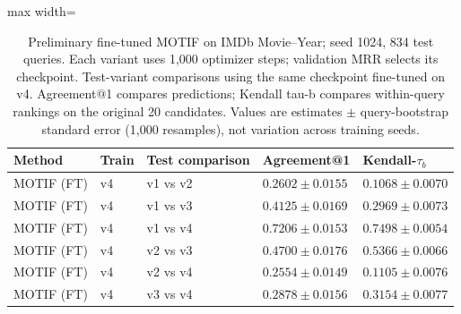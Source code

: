 \begin{table}[htbp]
\centering
\small
\renewcommand{\arraystretch}{1.15}
\setlength{\tabcolsep}{5pt}
\begin{adjustbox}{max width=\linewidth}
\begin{tabular}{|l|l|l|l|l|}
\hline
\textbf{Method} & \textbf{Train} & \textbf{Test comparison} & \textbf{Agreement@1} & \textbf{Kendall-$\tau_b$} \\
\hline
MOTIF (FT) & v4 & v1 vs v2 & $0.2602 \pm 0.0155$ & $0.1068 \pm 0.0070$ \\
\hline
MOTIF (FT) & v4 & v1 vs v3 & $0.4125 \pm 0.0169$ & $0.2969 \pm 0.0073$ \\
\hline
MOTIF (FT) & v4 & v1 vs v4 & $0.7206 \pm 0.0153$ & $0.7498 \pm 0.0054$ \\
\hline
MOTIF (FT) & v4 & v2 vs v3 & $0.4700 \pm 0.0176$ & $0.5366 \pm 0.0066$ \\
\hline
MOTIF (FT) & v4 & v2 vs v4 & $0.2554 \pm 0.0149$ & $0.1105 \pm 0.0076$ \\
\hline
MOTIF (FT) & v4 & v3 vs v4 & $0.2878 \pm 0.0156$ & $0.3154 \pm 0.0077$ \\
\hline
\end{tabular}
\end{adjustbox}
\caption{Preliminary fine-tuned MOTIF on IMDb Movie--Year; seed 1024, 834 test queries. Each variant uses 1,000 optimizer steps; validation MRR selects its checkpoint. Test-variant comparisons using the same checkpoint fine-tuned on v4. Agreement@1 compares predictions; Kendall tau-b compares within-query rankings on the original 20 candidates. Values are estimates $\pm$ query-bootstrap standard error (1,000 resamples), not variation across training seeds.}
\label{tab:motif-imdb-movie-year-matrix-transfer-comparisons-v4}
\end{table}
